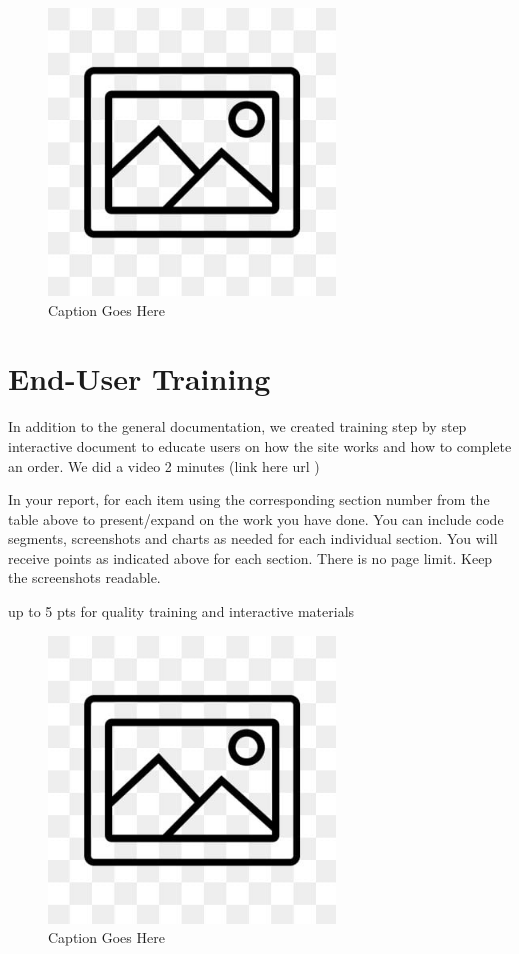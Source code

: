 \documentclass[12pt, letterpaper]{article}
\begin{document}
\begin{figure}[htbp]
	\centering
	\includegraphics[width=3in]{images/placeholder.jpg}
	\caption{Caption Goes Here}
 \end{figure}

 \newpage

\section{End-User Training}
In addition to the general documentation, we created training step by step interactive document to educate users on how the site works and how to complete an order. We did a video 2 minutes (link here url )

In your report, for each item using the corresponding section number from the table above to present/expand on the work you have done. You can include code segments, screenshots and charts as needed for each individual section. You will receive points as indicated above for each section. There is no page limit. Keep the screenshots readable.

up to 5 pts for quality training and interactive materials

\begin{figure}[htbp]
	\centering
	\includegraphics[width=3in]{images/placeholder.jpg}
	\caption{Caption Goes Here}
 \end{figure}
\end{document}

